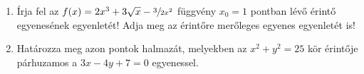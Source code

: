 \documentclass[a4paper, 12pt]{scrartcl}
\begin{document}
\begin{enumerate}
  \item Írja fel az $f(x) = 2x^3 + 3 \sqrt{x} - \sfrac{3}{2x^2}$ függvény
        $x_0 = 1$ pontban lévő érintő egyenesének egyenletét! Adja meg az
        érintőre merőleges egyenes egyenletét is!

  \item Határozza meg azon pontok halmazát, melyekben az $x^2 + y^2 = 25$ kör
        érintője párhuzamos a $3x - 4y + 7 = 0$ egyenessel.
\end{enumerate}

\end{document}

